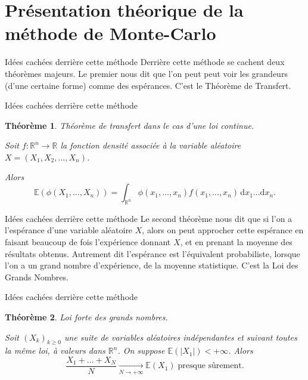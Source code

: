 \documentclass{beamer}
\newtheorem*{theo}{Théorème} %
\begin{document}
\section{Présentation théorique de la méthode de Monte-Carlo}

\begin{frame}{Idées cachées derrière cette méthode}
    Derrière cette méthode se cachent deux théorèmes majeurs.
    \medbreak
    Le premier nous dit que l'on peut peut voir les grandeurs (d'une certaine forme) comme des espérances. C'est le \alert{Théorème de Transfert}.
\end{frame}

\begin{frame}{Idées cachées derrière cette méthode}
    \begin{theo}
        Théorème de transfert dans le cas d'une loi continue.

        Soit $f : \mathbb{R}^n \rightarrow \mathbb{R}$ la fonction densité associée à la variable
        aléatoire $X = (X_1, X_2,...,X_n)$.

        Alors\[ \mathbb{E} \left( \phi(X_1, ..., X_n) \right) =  \int_{\mathbb{R}^n}
        \phi(x_1,...,x_n)f(x_1,...,x_n) \, \mathrm{d}x_1...\mathrm{d}x_n.  \] 
    \end{theo}
\end{frame}

\begin{frame}{Idées cachées derrière cette méthode}
    Le second théorème nous dit que si l'on a l'espérance d'une variable
    aléatoire $X$, alors on peut approcher cette espérance en faisant beaucoup
    de fois l'expérience donnant $X$, et en prenant la moyenne des résultats
    obtenus. Autrement dit l'espérance est l'équivalent probabiliste, lorsque
    l'on a un grand nombre d'expérience, de la moyenne statistique. C'est la
    \alert{Loi des Grands Nombres}.
\end{frame}

\begin{frame}{Idées cachées derrière cette méthode}
    \begin{theo}
     Loi forte des grands nombres.

    Soit $(X_k)_{k\ge 0}$ une suite de variables aléatoires indépendantes et suivant toutes la même loi, à valeurs dans $\mathbb{R}^n$. On suppose $\mathbb{E}(|X_1|) < +\infty $. Alors
    \[
        \frac{X_1+...+X_N}{N}\underset{N\to+\infty}{\longrightarrow}\mathbb{E}(X_1)\; \text{presque sûrement.}
    \]
\end{theo}
\end{frame}
\end{document}
